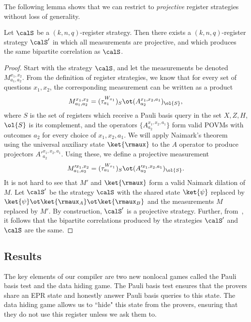 The following lemma shows that we can restrict to \emph{projective}
register strategies without loss of generality.
\begin{lemma}\label{lem:proj-suffices}
  Let $\calS$ be a $(k, n,q)$-register strategy. Then there exists a
  $(k,n,q)$-register strategy $\calS'$ in which all measurements are
  projective, and which produces the same bipartite correlation as $\calS$.
\end{lemma}
\begin{proof}
  Start with the strategy $\calS$, and let the measurements be denoted
  $M^{x_1, x_2}_{a_1, a_2}$. From the definition of register
  strategies, we know that for every set of questions $x_1, x_2$, the
  corresponding measurement can be written as a product
  \[ M^{x_1, x_2}_{a_1,a_2} = (\tau^{W_{x_1}}_{a_1})_{S} \ot (A^{x_1, x_2, a_1}_{a_2})_{\ol{S}}, \]
  where $S$ is the set of registers which receive a Pauli basis query
  in the set $X, Z, H$, $\ol{S}$ is its complement, and the operators
  $\{A^{x_1, x_2, a_1}_{a_2}\}$  form valid POVMs with outcomes $a_2$
  for every choice of $x_1, x_2, a_1$.
  We will apply Naimark's theorem~ using the
  universal auxiliary state $\ket{\rmaux}$ to the $A$ operator to produce projectors
  $A'^{x_1, x_2, a_1}_{a_2}$. Using these, we define a projective measurement
  \[ M'^{x_1, x_2}_{a_1, a_2} = (\tau^{W_{x_1}}_{a_1})_{S} \ot
    (A'^{x_1, x_2, a_1}_{a_2})_{\ol{S}}. \]
  It is not hard to see that $M'$ and $\ket{\rmaux}$ form a valid
  Naimark dilation of $M$.
  Let $\calS'$ be the strategy $\calS$ with the shared state
  $\ket{\psi}$ replaced by $\ket{\psi} \ot \ket{\rmaux_A} \ot
  \ket{\rmaux_B}$ and the measurements $M$ replaced by $M'$. By
  construction, $\calS'$ is a projective strategy. Further,
  from~, it follows that the bipartite
  correlations produced by the strategies $\calS'$ and $\calS$ are the same.
\end{proof}
\subsection{Results}\label{sec:register-results}

The key elements of our compiler are two new nonlocal games
called the Pauli basis test and the data hiding game.
The Pauli basis test ensures that the provers share an EPR state and honestly answer Pauli basis queries to this state.
The data hiding game allows us to ``hide" this state from the provers, ensuring that they do not use this register unless we ask them to.

